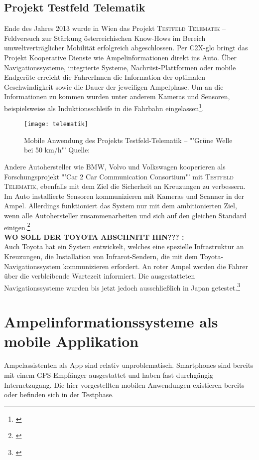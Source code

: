 \subsection{Projekt Testfeld Telematik}
Ende des Jahres 2013 wurde in Wien das Projekt \textsc{Testfeld Telematik} -- Feldversuch zur Stärkung österreichischen Know-Hows im Bereich umweltverträglicher Mobilität erfolgreich abgeschlossen. Per \gls{C2X-glo} bringt das Projekt Kooperative Dienste wie Ampelinformationen direkt ins Auto. Über Navigationssysteme, integrierte Systeme, Nachrüst-Plattformen oder mobile Endgeräte erreicht die FahrerInnen die Information der optimalen Geschwindigkeit sowie die Dauer der jeweiligen Ampelphase. Um an die Informationen zu kommen wurden unter anderem Kameras und Sensoren, beispielsweise als Induktionsschleife in die Fahrbahn eingelassen\footnote{\cite{Siemens}}.
\begin{figure}[H]
    \centering
    \texttt{[image: telematik]} \label{fig:telematik}
    \caption[Projekt Testfeld-Telematik Ampelinformation]{Mobile Anwendung des Projekts Testfeld-Telematik -- "'Grüne Welle bei 50 km/h"'  Quelle: \cite{Telematik}}
\end{figure}
Andere Autohersteller wie \gls{BMW}, Volvo und Volkswagen kooperieren als Forschungsprojekt "'Car 2 Car Communication Consortium"' mit \textsc{Testfeld Telematik}, ebenfalls mit dem Ziel die Sicherheit an Kreuzungen zu verbessern. Im Auto installierte Sensoren kommunizieren mit Kameras und Scanner in der Ampel. Allerdings funktioniert das System nur mit dem ambitionierten Ziel, wenn alle Autohersteller zusammenarbeiten und sich auf den gleichen Standard einigen.\footnote{\cite{Siemens}}
\\ \textbf{WO SOLL DER TOYOTA ABSCHNITT HIN??? :} \\
Auch Toyota hat ein System entwickelt, welches eine spezielle Infrastruktur an Kreuzungen, die Installation von Infrarot-Sendern, die mit dem Toyota-Navigationssystem kommunizieren erfordert. An roter Ampel werden die Fahrer über die verbleibende Wartezeit informiert. Die ausgestatteten Navigationssysteme wurden bis jetzt jedoch ausschließlich in Japan getestet.\footnote{\cite{Toyota}}
%
%
\section{Ampelinformationssysteme als mobile Applikation}
Ampelassistenten als App sind relativ unproblematisch. Smartphones sind bereits mit einem \gls{GPS}-Empfänger ausgestattet und haben fast durchgängig Internetzugang. Die hier vorgestellten mobilen Anwendungen existieren bereits oder befinden sich in der Testphase.
